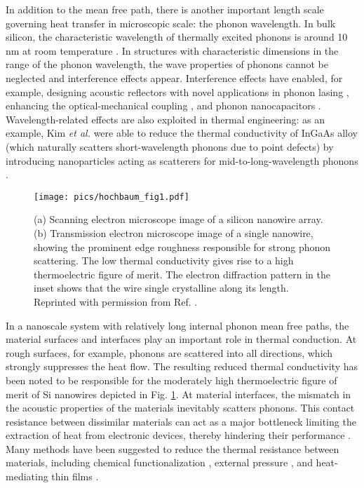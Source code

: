 In addition to the mean free path, there is another important length scale governing heat transfer in microscopic scale: the phonon wavelength. In bulk silicon, the characteristic wavelength of thermally excited phonons is around 10 nm at room temperature \cite{ju99}. In structures with characteristic dimensions in the range of the phonon wavelength, the wave properties of phonons cannot be neglected and interference effects appear. Interference effects have enabled, for example, designing acoustic reflectors with novel applications in phonon lasing \cite{maryam13}, enhancing the optical-mechanical coupling \cite{fainstein13}, and phonon nanocapacitors \cite{han15}. Wavelength-related effects are also exploited in thermal engineering: as an example, Kim \textit{et al.} were able to reduce the thermal conductivity of InGaAs alloy (which naturally scatters short-wavelength phonons due to point defects) by introducing nanoparticles acting as scatterers for mid-to-long-wavelength phonons \cite{kim06}. %

\begin{figure}
\begin{center}
 \texttt{[image: pics/hochbaum\_fig1.pdf]}
 \caption{(a) Scanning electron microscope image of a silicon nanowire array. (b) Transmission electron microscope image of a single nanowire, showing the prominent edge roughness responsible for strong phonon scattering. The low thermal conductivity gives rise to a high thermoelectric figure of merit. The electron diffraction pattern in the inset shows that the wire single crystalline along its length. Reprinted with permission from Ref. \cite{hochbaum08}.}
\label{fig:intro_hochbaum}
\end{center}
\end{figure}

In a nanoscale system with relatively long internal phonon mean free paths, the material surfaces and interfaces play an important role in thermal conduction. At rough surfaces, for example, phonons are scattered into all directions, which strongly suppresses the heat flow. The resulting reduced thermal conductivity has been noted to be responsible for the moderately high thermoelectric figure of merit of Si nanowires \cite{hochbaum08} depicted in Fig. \ref{fig:intro_hochbaum}. At material interfaces, the mismatch in the acoustic properties of the materials inevitably scatters phonons.  This contact resistance between dissimilar materials can act as a major bottleneck limiting the extraction of heat from electronic devices, thereby hindering their performance \cite{pop10}. Many methods have been suggested to reduce the thermal resistance between materials, including chemical functionalization \cite{hopkins11,kaur14}, external pressure \cite{shen11,chalopin12}, and heat-mediating thin films \cite{english12}. %

